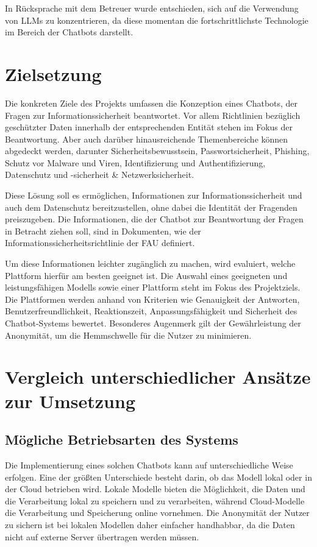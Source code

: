 \documentclass[german,report]{i1thesis}
\begin{document}
In Rücksprache mit dem Betreuer wurde entschieden, sich auf die Verwendung von \acp{LLM} zu konzentrieren, da diese momentan die fortschrittlichste Technologie im Bereich der Chatbots darstellt.

\section{Zielsetzung}
\label{sec:zielsetzung}

Die konkreten Ziele des Projekts umfassen die Konzeption eines Chatbots, der Fragen zur Informationssicherheit beantwortet.
Vor allem Richtlinien bezüglich geschützter Daten innerhalb der entsprechenden Entität stehen im Fokus der Beantwortung.
Aber auch darüber hinausreichende Themenbereiche können abgedeckt werden, darunter Sicherheitsbewusstsein, Passwortsicherheit, Phishing, Schutz vor Malware und Viren, Identifizierung und Authentifizierung, Datenschutz und -sicherheit \& Netzwerksicherheit.

Diese Lösung soll es ermöglichen, Informationen zur Informationssicherheit und auch dem Datenschutz bereitzustellen, ohne dabei die Identität der Fragenden preiszugeben.
Die Informationen, die der Chatbot zur Beantwortung der Fragen in Betracht ziehen soll, sind in Dokumenten, wie der Informationssicherheitsrichtlinie der \ac{FAU} definiert.

Um diese Informationen leichter zugänglich zu machen, wird evaluiert, welche Plattform hierfür am besten geeignet ist.
Die Auswahl eines geeigneten und leistungsfähigen Modells sowie einer Plattform steht im Fokus des Projektziels.
Die Plattformen werden anhand von Kriterien wie Genauigkeit der Antworten, Benutzerfreundlichkeit, Reaktionszeit, Anpassungsfähigkeit und Sicherheit des Chatbot-Systems bewertet.
Besonderes Augenmerk gilt der Gewährleistung der Anonymität, um die Hemmschwelle für die Nutzer zu minimieren.

\newpage
\section{Vergleich unterschiedlicher Ansätze zur Umsetzung}%
\label{sec:vergleich}

\subsection{Mögliche Betriebsarten des Systems}

Die Implementierung eines solchen Chatbots kann auf unterschiedliche Weise erfolgen.
Eine der größten Unterschiede besteht darin, ob das Modell lokal oder in der Cloud betrieben wird.
Lokale Modelle bieten die Möglichkeit, die Daten und die Verarbeitung lokal zu speichern und zu verarbeiten, während Cloud-Modelle die Verarbeitung und Speicherung online vornehmen.
Die Anonymität der Nutzer zu sichern ist bei lokalen Modellen daher einfacher handhabbar, da die Daten nicht auf externe Server übertragen werden müssen.
\end{document}

